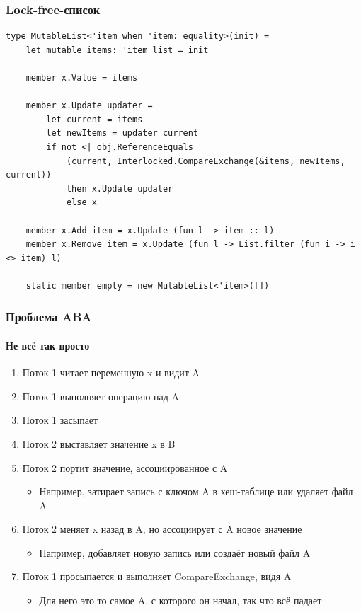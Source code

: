 \documentclass{../../slides-style}
\begin{document}
    \begin{frame}[fragile]
        \frametitle{Lock-free-список}
        \begin{footnotesize}
            \begin{verbatim}
type MutableList<'item when 'item: equality>(init) =
    let mutable items: 'item list = init

    member x.Value = items

    member x.Update updater =
        let current = items
        let newItems = updater current
        if not <| obj.ReferenceEquals
            (current, Interlocked.CompareExchange(&items, newItems, current))
            then x.Update updater
            else x

    member x.Add item = x.Update (fun l -> item :: l)
    member x.Remove item = x.Update (fun l -> List.filter (fun i -> i <> item) l)

    static member empty = new MutableList<'item>([])
            \end{verbatim}
        \end{footnotesize}
    \end{frame}

    \begin{frame}
        \frametitle{Проблема ABA}
        \framesubtitle{Не всё так просто}
        \begin{enumerate}
            \item Поток 1 читает переменную x и видит A
            \item Поток 1 выполняет операцию над A
            \item Поток 1 засыпает
            \item Поток 2 выставляет значение x в B
            \item Поток 2 портит значение, ассоциированное с A
            \begin{itemize}
                \item Например, затирает запись с ключом A в хеш-таблице или удаляет файл A
            \end{itemize}
            \item Поток 2 меняет x назад в A, но ассоциирует с A новое значение 
            \begin{itemize}
                \item Например, добавляет новую запись или создаёт новый файл A
            \end{itemize}
            \item Поток 1 просыпается и выполняет CompareExchange, видя A
            \begin{itemize}
                \item Для него это то самое A, с которого он начал, так что всё падает
            \end{itemize}
        \end{enumerate}
    \end{frame}
\end{document}
